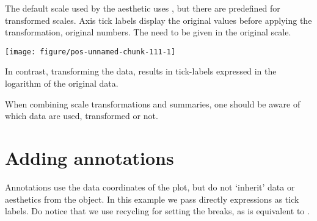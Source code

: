 \documentclass[paper=a4,headsepline,BCOR=12mm,twoside,open=right,%
titlepage,headings=small,fontsize=10pt,index=totoc,bibliography=totoc,%
captions=tableheading,captions=nooneline]{scrbook}\usepackage{knitr}
\begin{document}
The default scale used by the  aesthetic uses , but there are predefined for transformed scales. Axis tick labels display the original values before applying the transformation, original numbers. The  need to be given in the original scale.

\begin{knitrout}\footnotesize
{}\color{fgcolor}\begin{kframe}
\begin{alltt}
 \hlopt{+} \hlstd{(}\hlstd{=}\hlstd{(}\hlstd{,}\hlstd{,}\hlstd{,}\hlstd{))}
\end{alltt}
\end{kframe}

{\centering \texttt{[image: figure/pos-unnamed-chunk-111-1]} 

}



\end{knitrout}

In contrast, transforming the data, results in tick-labels expressed in the logarithm of the original data.

\begin{knitrout}\footnotesize
{}\color{fgcolor}\begin{kframe}
\begin{alltt}
 \hlkwb{<-}    \hlopt{+} \hlstd{()}
\end{alltt}
\end{kframe}
\end{knitrout}

When combining scale transformations and summaries, one should be aware of which data are used, transformed or not.


\section{Adding annotations}

Annotations use the data coordinates of the plot, but do not `inherit' data or aesthetics from the  object. In this example we pass directly expressions as tick labels. Do notice that we use recycling for setting the breaks, as  is equivalent to .
\end{document}
